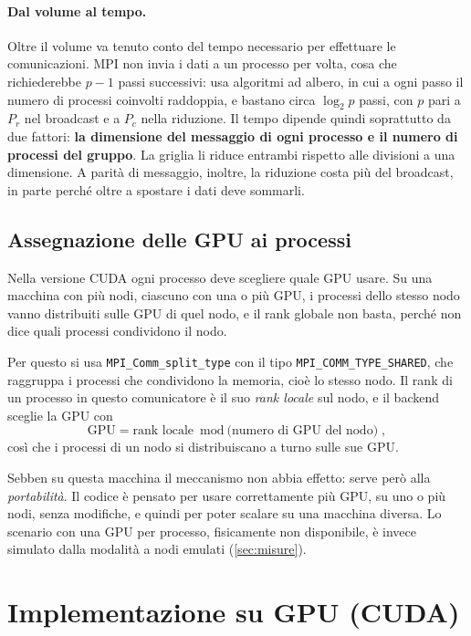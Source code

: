 \documentclass[11pt,a4paper]{article}
\begin{document}
\paragraph{Dal volume al tempo.} Oltre il volume va tenuto conto del tempo necessario per effettuare le comunicazioni. MPI non
invia i dati a un processo per volta, cosa che richiederebbe $p - 1$ passi
successivi: usa algoritmi ad albero, in cui a ogni passo il numero di processi
coinvolti raddoppia, e bastano circa $\log_2 p$ passi, con $p$ pari a $P_r$ nel
broadcast e a $P_c$ nella riduzione. Il tempo dipende quindi soprattutto da due
fattori: \textbf{la dimensione del messaggio di ogni processo e il numero di
processi del gruppo}. La griglia li riduce entrambi rispetto alle divisioni a una
dimensione. A parità di messaggio, inoltre, la riduzione costa più del
broadcast, in parte perché oltre a spostare i dati deve sommarli.

\subsection{Assegnazione delle GPU ai processi}\label{sec:gpu-assign}

Nella versione CUDA ogni processo deve scegliere quale GPU usare. Su una
macchina con più nodi, ciascuno con una o più GPU, i processi dello stesso
nodo vanno distribuiti sulle GPU di quel nodo, e il rank globale non basta,
perché non dice quali processi condividono il nodo.

Per questo si usa \texttt{MPI\_Comm\_split\_type} con il tipo
\texttt{MPI\_COMM\_TYPE\_SHARED}, che raggruppa i processi che condividono la
memoria, cioè lo stesso nodo. Il rank di un processo in questo comunicatore è
il suo \emph{rank locale} sul nodo, e il backend sceglie la GPU con
\[
  \text{GPU} = \text{rank locale} \bmod \text{(numero di GPU del nodo)},
\]
così che i processi di un nodo si distribuiscano a turno sulle sue GPU.

Sebben su questa macchina il meccanismo non abbia effetto:
serve però alla \emph{portabilità}. Il codice è pensato per usare correttamente
più GPU, su uno o più nodi, senza modifiche, e quindi per poter scalare su una
macchina diversa. Lo scenario con una GPU per processo, fisicamente non disponibile, è invece simulato
dalla modalità a nodi emulati (\cref{sec:misure}).

\section{Implementazione su GPU (CUDA)}\label{sec:gpu}
\end{document}
